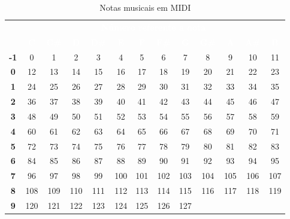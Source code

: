     \begin{table}[H]
        \centering
        \begin{tabular}{| c | c | c | c | c | c | c | c | c | c | c | c | c |}
            \hline
            \rowcolor{darkRed} & \multicolumn{12}{c|}{\textcolor{white}{\textbf{Número referente a nota}}} \\
            \cline{2-13}
            \rowcolor{darkRed} \multirow{-2}{*}{\textcolor{white}{\textbf{Oitava}}} & \textcolor{white}{\textbf{C}} & \textcolor{white}{\textbf{C\#}} & \textcolor{white}{\textbf{D}} & \textcolor{white}{\textbf{D\#}} & \textcolor{white}{\textbf{E}} & \textcolor{white}{\textbf{F}} & \textcolor{white}{\textbf{F\#}} & \textcolor{white}{\textbf{G}} & \textcolor{white}{\textbf{G\#}} & \textcolor{white}{\textbf{A}} & \textcolor{white}{\textbf{A\#}} & \textcolor{white}{\textbf{B}} \\
            \hline
            \rowcolor{lightRed} \textbf{-1} &  0   & 1   & 2   & 3   & 4   & 5   & 6   & 7   & 8   & 9   & 10 & 11 \\
            \hline
            \rowcolor{white}     \textbf{0} &  12  & 13  & 14  & 15  & 16  & 17  & 18  & 19  & 20  & 21  & 22 & 23 \\
            \hline
            \rowcolor{lightRed}  \textbf{1} &  24  & 25  & 26  & 27  & 28  & 29  & 30  & 31  & 32  & 33  & 34 & 35 \\
            \hline
            \rowcolor{white}     \textbf{2} &  36  & 37  & 38  & 39  & 40  & 41  & 42  & 43  & 44  & 45  & 46 & 47 \\
            \hline
            \rowcolor{lightRed}  \textbf{3} &  48  & 49  & 50  & 51  & 52  & 53  & 54  & 55  & 56  & 57  & 58 & 59 \\
            \hline
            \rowcolor{white}     \textbf{4} &  60  & 61  & 62  & 63  & 64  & 65  & 66  & 67  & 68  & 69  & 70 & 71 \\
            \hline
            \rowcolor{lightRed}  \textbf{5} &  72  & 73  & 74  & 75  & 76  & 77  & 78  & 79  & 80  & 81  & 82 & 83 \\
            \hline
            \rowcolor{white}     \textbf{6} &  84  & 85  & 86  & 87  & 88  & 89  & 90  & 91  & 92  & 93  & 94 & 95 \\
            \hline
            \rowcolor{lightRed}  \textbf{7} &  96  & 97  & 98  & 99  & 100 & 101 & 102 & 103 & 104 & 105 & 106 & 107 \\
            \hline
            \rowcolor{white}     \textbf{8} &  108 & 109 & 110 & 111 & 112 & 113 & 114 & 115 & 116 & 117 & 118 & 119 \\
            \hline
            \rowcolor{lightRed}  \textbf{9} &  120 & 121 & 122 & 123 & 124 & 125 & 126 & 127 &     &     &     &     \\
            \hline
        \end{tabular}
        \caption{Notas musicais em MIDI}
        \label{table:MIDI_notes}
    \end{table}

